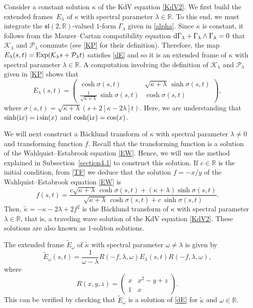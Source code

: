 \documentclass[pdftex]{sigma}
\numberwithin{equation}{section}
\def\bending{\kappa}
\def\R{\mathbb{R}}
\begin{document}
Consider a constant solution $\bending$ of the KdV equation \eqref{KdV2}. We first build the extended frames~$E_\lambda$ of $\bending$ with spectral parameter $\lambda\in\R$. To this end, we must integrate the $\mathfrak{sl}(2,\mathbb{R})$-valued $1$-form $\Gamma_\lambda$ given in \eqref{alpha}.
Since $\bending$ is constant, it follows from the Maurer--Cartan compatibility equation ${\rm d}\Gamma_\lambda+\Gamma_\lambda\wedge\Gamma_\lambda=0$ that $\mathcal{K}_\lambda$ and $\mathcal{P}_\lambda$ commute (see \eqref{KP} for their definition). Therefore, the map $E_\lambda(s,t)={\rm Exp}(\mathcal{K}_\lambda s+\mathcal{P}_\lambda t)$ satisfies \eqref{dE} and so it is an extended frame of $\bending$ with spectral parameter $\lambda\in\mathbb{R}$. A computation involving the definition of $\mathcal{K}_\lambda$ and $\mathcal{P}_\lambda$ given in \eqref{KP} shows that
\begin{equation*}
	E_{\lambda}(s,t) = \begin{pmatrix}\cosh\sigma(s,t)&\sqrt{\bending+\lambda}\,\sinh\sigma(s,t)\\
		\frac{1}{\sqrt{\bending+\lambda}}\,\sinh\sigma(s,t)&\cosh\sigma(s,t)\end{pmatrix},
\end{equation*}
where $\sigma(s,t)=\sqrt{\bending+\lambda}(s+2[\bending-2\lambda]t)$.
Here, we are understanding that $\sinh({\rm i}x)={\rm i}\sin(x)$ and $\cosh({\rm i}x)=\cos(x)$.

We will next construct a B\"{a}cklund transform of $\bending$ with spectral parameter $\lambda\neq 0$ and transforming function $f$. Recall that the transforming function is a solution of the Wahlquist--Estabrook equation \eqref{EW}. Hence, we will use the method explained in Subsection~\ref{section4.1} to construct this solution. If $c\in\R$ is the initial condition, from \eqref{TF} we deduce that the solution $f=-x/y$ of the Wahlquist--Estabrook equation \eqref{EW} is
\begin{equation}\label{f}
	f(s,t)=\frac{c\sqrt{\bending+\lambda}\,\cosh\sigma(s,t)+(\bending+\lambda)\sinh\sigma(s,t)}{\sqrt{\bending+\lambda}\,\cosh\sigma(s,t)+c\,\sinh\sigma(s,t)}.
\end{equation}
Then, $\widetilde{\bending}=-\bending -2\lambda +2f^2$
is the B\"{a}cklund transform  of  $\bending$ with spectral parameter $\lambda\in\R$, that is, a traveling wave solution of the KdV equation \eqref{KdV2}. These solutions are also known as $1$-soliton solutions.

The extended frame $\widetilde{E}_{\omega}$ of $\widetilde{\bending}$ with spectral parameter $\omega\neq \lambda$ is given by
\begin{equation}\label{recon}
	\widetilde{E}_{\omega}(s,t)=\frac{1}{\omega-\lambda}R(-f,\lambda,\omega) E_{\lambda}(s,t) R(-f,\lambda,\omega),
\end{equation}
where
\begin{equation*}R(x,y,z)=\begin{pmatrix}x&x^2-y+z\\1&x\end{pmatrix}.\end{equation*}
This can be verified by checking that $\widetilde{E}_{\omega}$ is a solution of \eqref{dE} for $\widetilde{\bending}$ and $\omega\in\R$.
\end{document}
